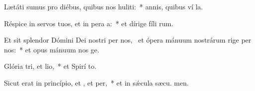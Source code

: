\item Lætáti sumus pro diébus, quibus nos huliti:~* annis, quibus ví la.
\item Réspice in servos tuos, et in pera a:~* et dírige fíli rum.
\item Et sit splendor Dómini Dei nostri per nos,~\pscross{} et ópera mánuum nostrárum rige per nos:~* et opus mánuum nos ge.
\item Glória tri, et lio,~* et Spirí to.
\item Sicut erat in princípio, et , et per,~* et in sǽcula sæcu. men.
